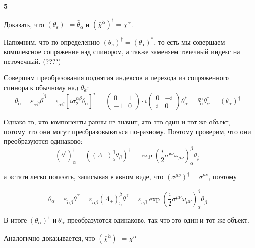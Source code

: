 \documentclass[a4paper,12pt]{article} %
\begin{document}
\begin{task}\textbf{5}

Доказать, что	
$\left(\theta_{\alpha}\right)^{\dagger}=\bar{\theta}_{\dot{\alpha}}$ 
и 
$\left(\bar{\chi}^{\dot{\alpha}}\right)^{\dagger}=\chi^{\alpha}$.

Напомним, что по определению $ \left(\theta_{\alpha}\right)^{\dagger}=\left(\theta_{\dot{\alpha}}\right)^{*}$, 
то есть мы совершаем комплексное сопряжение над спинором, а также заменяем точечный индекс на неточечный.
(????)

Совершим преобразования поднятия индексов и перехода из сопряженного спинора к обычному над $\bar{\theta}_{\dot{\alpha}}$:
\[ \bar{\theta}_{\dot{\alpha}}=\varepsilon_{\dot{\alpha}\dot{\beta}}\bar{\theta}^{\dot{\beta}}= 
\varepsilon_{\dot{\alpha}\dot{\beta}}[i\sigma_2^{\alpha\dot{\beta}} \theta_\alpha]^{*}=
\left(\begin{array}{cc}
	{0} & {1} \\ {-1} & {0}
\end{array}\right) \cdot i
\left(\begin{array}{cc}
	{0} & {-i} \\ {i} & {0}
\end{array}\right)\theta_\alpha^{*}=
\delta_{\dot{\alpha}}^{\alpha}\theta_\alpha^{*}= (\theta_\alpha)^{\dagger}
\]

Однако то, что компоненты равны не значит, что это один и тот же объект, потому что они могут преобразовываться по-разному.
Поэтому проверим, что они преобразуются одинаково:
\[ (\theta^\prime)^\dagger_\alpha=
((\Lambda_{-})^\beta_\alpha \theta_\beta)^\dagger=
\exp \left(\frac{i}{2}\sigma^{\mu\nu}\omega_{\mu\nu}\right)^\beta_\alpha \theta_\beta^\dagger \]


а кстати легко показать, записывая в явном виде, что 
$(\sigma^{\mu\nu})^\dagger=\bar{\sigma}^{\mu\nu} $, поэтому

$$
\bar{\theta}_{\dot{\alpha}}
=
\varepsilon_{\dot{\alpha}\dot{\beta}}\bar{\theta}^{\dot{\alpha}} 
=
\varepsilon_{\dot{\alpha}\dot{\beta}} 
(\Lambda_{+})_{\dot{\gamma}}^{\dot{\beta} }
\bar{\theta}^{\dot{\gamma}}
=
\varepsilon_{\dot{\alpha}\dot{\beta}}
\exp 
\left(\frac{i}{2}\sigma^{\mu\nu}\omega_{\mu\nu}
\right)^{\dot{\beta}}_{\dot{\alpha}}
\bar{\theta}_{\dot{\beta}}
$$


В итоге $\left(\theta_{\alpha}\right)^{\dagger}$ и $\bar{\theta}_{\dot{\alpha}}$ преобразуются одинаково, так что это один и тот же объект.



Аналогично доказывается, что  $\left(\bar{\chi}^{\dot{\alpha}}\right)^{\dagger}=\chi^{\alpha}$



























\end{task}
\end{document}
